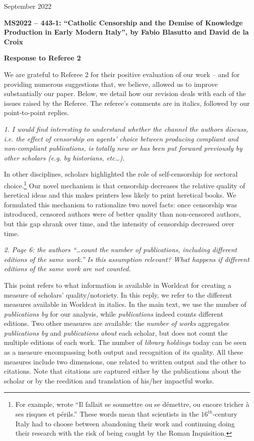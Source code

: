 \documentclass[12pt]{article}
\begin{document}
\hfill September 2022

\textbf{MS2022 – 443-1: “Catholic Censorship and the Demise of Knowledge Production in
Early Modern Italy”, by Fabio Blasutto and David de la Croix}

\textbf{Response to Referee 2}


We are  grateful to Referee 2 for their positive evaluation of our work – and
for providing numerous suggestions that, we believe, allowed us to improve substantially our
paper. Below, we detail how our revision deals with each of the issues raised by the Referee.
The referee's comments are in italics, followed by our point-to-point replies.

\textit{
1. I would find interesting to understand whether the channel the authors discuss, i.e. the effect of censorship
on agents’ choice between producing compliant and non-compliant publications, is totally new or has been
put forward previously by other scholars (e.g. by historians, etc…).
}


In other disciplines, scholars highlighted the role of self-censorship for sectoral choice.\footnote{For example,  wrote “Il fallait se soumettre ou se démettre, ou encore tricher à ses risques et périls.” These words mean that scientists in the $16^{th}$-century Italy had to choose between abandoning their work and continuing doing their research with the risk of being caught by the Roman Inquisition.} Our novel mechanism is that censorship decreases the relative quality of heretical ideas and this makes printers less likely to print heretical books. We formulated this mechanism to rationalize two novel facts: once censorship was introduced, censored authors were of better quality than non-censored authors, but this gap shrank over time, and the intensity of censorship decreased over time.


\textit{
2. Page 6: the authors “…count the number of publications, including different editions of the same work.”
Is this assumption relevant? What happens if different editions of the same work are not counted.
}

This point refers to what information is available in Worldcat for creating a measure of scholars' quality/notoriety. In this reply, we refer to the different measures available in Worldcat in italics. In the main text, we use the number of \textit{publications by} for our analysis, while \textit{publications} indeed counts different editions.
Two other measures are available: the \textit{number of works} aggregates \textit{publications by} and \textit{publications about} each scholar, but does not count the multiple editions of each work. The number of \textit{library holdings} today can be seen as a measure encompassing both output and recognition of its quality. All these measures include two dimensions, one related to written output and the other to citations. Note that citations are captured either by the publications about the scholar or by the reedition and translation of his/her impactful works.
\end{document}
